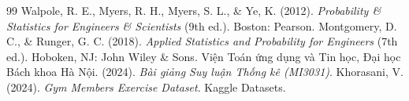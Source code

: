 \documentclass[12pt,a4paper]{report}
\begin{document}
\begin{thebibliography}{99}
 Walpole, R. E., Myers, R. H., Myers, S. L., \& Ye, K. (2012). \textit{Probability \& Statistics for Engineers \& Scientists} (9th ed.). Boston: Pearson.
 Montgomery, D. C., \& Runger, G. C. (2018). \textit{Applied Statistics and Probability for Engineers} (7th ed.). Hoboken, NJ: John Wiley \& Sons.
 Viện Toán ứng dụng và Tin học, Đại học Bách khoa Hà Nội. (2024). \textit{Bài giảng Suy luận Thống kê (MI3031)}.
 Khorasani, V. (2024). \textit{Gym Members Exercise Dataset}. Kaggle Datasets.
\end{thebibliography}
\end{document}
